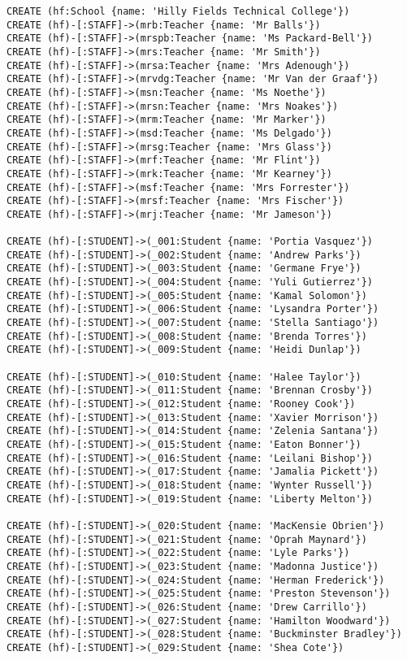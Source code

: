 \begin{lstlisting}
CREATE (hf:School {name: 'Hilly Fields Technical College'})
CREATE (hf)-[:STAFF]->(mrb:Teacher {name: 'Mr Balls'})
CREATE (hf)-[:STAFF]->(mrspb:Teacher {name: 'Ms Packard-Bell'})
CREATE (hf)-[:STAFF]->(mrs:Teacher {name: 'Mr Smith'})
CREATE (hf)-[:STAFF]->(mrsa:Teacher {name: 'Mrs Adenough'})
CREATE (hf)-[:STAFF]->(mrvdg:Teacher {name: 'Mr Van der Graaf'})
CREATE (hf)-[:STAFF]->(msn:Teacher {name: 'Ms Noethe'})
CREATE (hf)-[:STAFF]->(mrsn:Teacher {name: 'Mrs Noakes'})
CREATE (hf)-[:STAFF]->(mrm:Teacher {name: 'Mr Marker'})
CREATE (hf)-[:STAFF]->(msd:Teacher {name: 'Ms Delgado'})
CREATE (hf)-[:STAFF]->(mrsg:Teacher {name: 'Mrs Glass'})
CREATE (hf)-[:STAFF]->(mrf:Teacher {name: 'Mr Flint'})
CREATE (hf)-[:STAFF]->(mrk:Teacher {name: 'Mr Kearney'})
CREATE (hf)-[:STAFF]->(msf:Teacher {name: 'Mrs Forrester'})
CREATE (hf)-[:STAFF]->(mrsf:Teacher {name: 'Mrs Fischer'})
CREATE (hf)-[:STAFF]->(mrj:Teacher {name: 'Mr Jameson'})

CREATE (hf)-[:STUDENT]->(_001:Student {name: 'Portia Vasquez'})
CREATE (hf)-[:STUDENT]->(_002:Student {name: 'Andrew Parks'})
CREATE (hf)-[:STUDENT]->(_003:Student {name: 'Germane Frye'})
CREATE (hf)-[:STUDENT]->(_004:Student {name: 'Yuli Gutierrez'})
CREATE (hf)-[:STUDENT]->(_005:Student {name: 'Kamal Solomon'})
CREATE (hf)-[:STUDENT]->(_006:Student {name: 'Lysandra Porter'})
CREATE (hf)-[:STUDENT]->(_007:Student {name: 'Stella Santiago'})
CREATE (hf)-[:STUDENT]->(_008:Student {name: 'Brenda Torres'})
CREATE (hf)-[:STUDENT]->(_009:Student {name: 'Heidi Dunlap'})

CREATE (hf)-[:STUDENT]->(_010:Student {name: 'Halee Taylor'})
CREATE (hf)-[:STUDENT]->(_011:Student {name: 'Brennan Crosby'})
CREATE (hf)-[:STUDENT]->(_012:Student {name: 'Rooney Cook'})
CREATE (hf)-[:STUDENT]->(_013:Student {name: 'Xavier Morrison'})
CREATE (hf)-[:STUDENT]->(_014:Student {name: 'Zelenia Santana'})
CREATE (hf)-[:STUDENT]->(_015:Student {name: 'Eaton Bonner'})
CREATE (hf)-[:STUDENT]->(_016:Student {name: 'Leilani Bishop'})
CREATE (hf)-[:STUDENT]->(_017:Student {name: 'Jamalia Pickett'})
CREATE (hf)-[:STUDENT]->(_018:Student {name: 'Wynter Russell'})
CREATE (hf)-[:STUDENT]->(_019:Student {name: 'Liberty Melton'})

CREATE (hf)-[:STUDENT]->(_020:Student {name: 'MacKensie Obrien'})
CREATE (hf)-[:STUDENT]->(_021:Student {name: 'Oprah Maynard'})
CREATE (hf)-[:STUDENT]->(_022:Student {name: 'Lyle Parks'})
CREATE (hf)-[:STUDENT]->(_023:Student {name: 'Madonna Justice'})
CREATE (hf)-[:STUDENT]->(_024:Student {name: 'Herman Frederick'})
CREATE (hf)-[:STUDENT]->(_025:Student {name: 'Preston Stevenson'})
CREATE (hf)-[:STUDENT]->(_026:Student {name: 'Drew Carrillo'})
CREATE (hf)-[:STUDENT]->(_027:Student {name: 'Hamilton Woodward'})
CREATE (hf)-[:STUDENT]->(_028:Student {name: 'Buckminster Bradley'})
CREATE (hf)-[:STUDENT]->(_029:Student {name: 'Shea Cote'})


\end{lstlisting}
